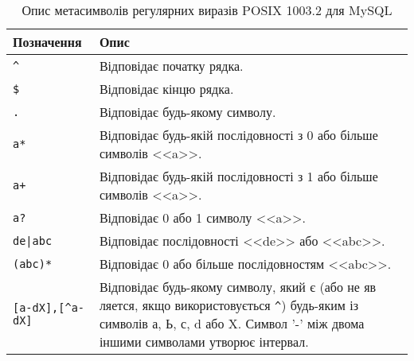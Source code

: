 \begin{longtable}[t]{|l|p{20em}|}

\caption{Опис метасимволів регулярних виразів POSIX 1003.2 для MySQL} \label{chr-rxp:table}\\
\hline

Позначення & Опис \\
\hline




\verb|^| & Відповідає початку рядка. \\

\verb|$| & Відповідає кінцю рядка. \\

\verb|.| & Відповідає будь-якому символу. \\

\verb|a*| & Відповідає будь-якій послідовності з 0 або більше символів <<a>>. \\

\verb|a+| & Відповідає будь-якій послідовності з 1 або більше символів <<a>>. \\

\verb|a?| & Відповідає 0 або 1 символу <<a>>. \\

\verb'de|abc' & Відповідає послідовності <<de>> або <<abc>>. \\

\verb|(abc)*| & Відповідає 0 або більше послідовностям <<abc>>.  \\

\verb|[a-dX],[^a-dX]| & Відповідає будь-якому символу, який є (або не яв ляется, якщо використовується \verb|^|) будь-яким із символів а, Ь, с, d або X. Символ '-' між двома іншими символами утворює інтервал. \\
  
\hline
\end{longtable}


\pagebreak[3]



